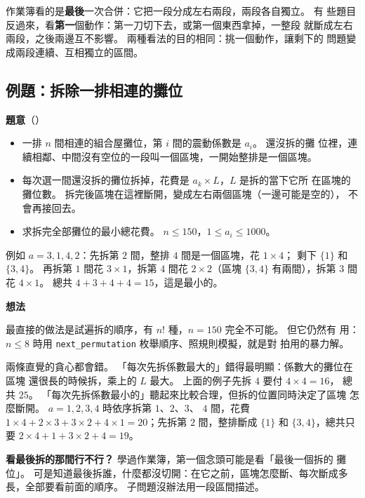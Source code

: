 作業簿看的是\textbf{最後}一次合併：它把一段分成左右兩段，兩段各自獨立。 有
些題目反過來，看\textbf{第一}個動作：第一刀切下去，或第一個東西拿掉，一整段
就斷成左右兩段，之後兩邊互不影響。 兩種看法的目的相同：挑一個動作，讓剩下的
問題變成兩段連續、互相獨立的區間。

\subsection{例題：拆除一排相連的攤位}
\label{sec:ex-ivdp-demolish}

\textbf{題意}（）

\begin{itemize}
\item 一排 $n$ 間相連的組合屋攤位，第 $i$ 間的震動係數是 $a_i$。 還沒拆的攤
位裡，連續相鄰、中間沒有空位的一段叫一個區塊，一開始整排是一個區塊。
\item 每次選一間還沒拆的攤位拆掉，花費是 $a_k \times L$，$L$ 是拆的當下它所
在區塊的攤位數。 拆完後區塊在這裡斷開，變成左右兩個區塊（一邊可能是空的），
不會再接回去。
\item 求拆完全部攤位的最小總花費。 $n \le 150$，$1 \le a_i \le 1000$。
\end{itemize}

例如 $a = 3, 1, 4, 2$：先拆第 $2$ 間，整排 $4$ 間是一個區塊，花 $1 \times 4$；
剩下 $\{1\}$ 和 $\{3, 4\}$。 再拆第 $1$ 間花 $3 \times 1$，拆第 $4$ 間花
$2 \times 2$（區塊 $\{3, 4\}$ 有兩間），拆第 $3$ 間花 $4 \times 1$。 總共
$4 + 3 + 4 + 4 = 15$，這是最小的。

\textbf{想法}

最直接的做法是試遍拆的順序，有 $n!$ 種，$n = 150$ 完全不可能。 但它仍然有
用：$n \le 8$ 時用 \texttt{next\_permutation} 枚舉順序、照規則模擬，就是對
拍用的暴力解。

兩條直覺的貪心都會錯。 「每次先拆係數最大的」錯得最明顯：係數大的攤位在區塊
還很長的時候拆，乘上的 $L$ 最大。 上面的例子先拆 $4$ 要付 $4 \times 4 = 16$，
總共 $25$。 「每次先拆係數最小的」聽起來比較合理，但拆的位置同時決定了區塊
怎麼斷開。 $a = 1, 2, 3, 4$ 時依序拆第 $1$、$2$、$3$、
$4$ 間，花費 $1 \times 4 + 2 \times 3 + 3 \times 2 + 4 \times 1 = 20$；先拆第
$2$ 間，整排斷成 $\{1\}$ 和 $\{3, 4\}$，總共只要
$2 \times 4 + 1 + 3 \times 2 + 4 = 19$。

\textbf{看最後拆的那間行不行？} 學過作業簿，第一個念頭可能是看「最後一個拆的
攤位」。 可是知道最後拆誰，什麼都沒切開：在它之前，區塊怎麼斷、每次斷成多
長，全部要看前面的順序。 子問題沒辦法用一段區間描述。

